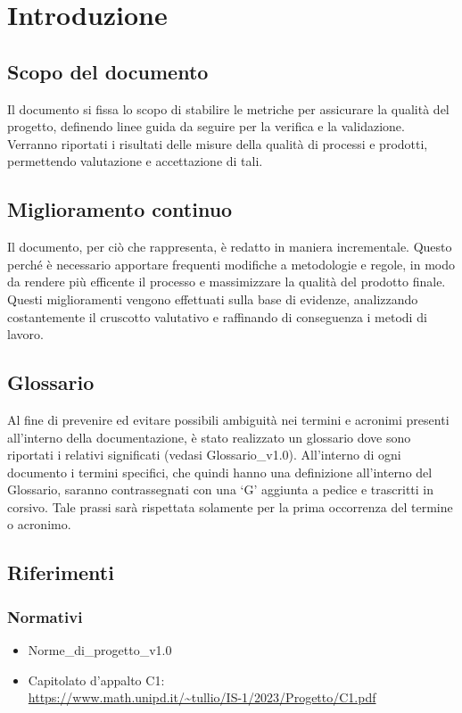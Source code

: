 \chapter{Introduzione}

\section{Scopo del documento}
Il documento si fissa lo scopo di stabilire le metriche per assicurare la qualità del progetto, definendo linee guida da seguire per la verifica e la validazione. Verranno riportati i risultati delle misure della qualità di processi e prodotti, permettendo valutazione e accettazione di tali.

\section{Miglioramento continuo}
Il documento, per ciò che rappresenta, è redatto in maniera incrementale. Questo perché è necessario apportare frequenti modifiche a metodologie e regole, in modo da rendere più efficente il processo e massimizzare la qualità del prodotto finale. Questi miglioramenti vengono effettuati sulla base di evidenze, analizzando costantemente il cruscotto valutativo e raffinando di conseguenza i metodi di lavoro.

\section{Glossario}
Al fine di prevenire ed evitare possibili ambiguità nei termini e acronimi presenti all’interno della documentazione, è stato realizzato un glossario dove sono riportati i relativi significati (vedasi Glossario\_v1.0). All’interno di ogni documento i termini specifici, che quindi hanno una definizione all’interno del Glossario, saranno contrassegnati con una ‘G’ aggiunta a pedice e trascritti in corsivo. Tale prassi sarà rispettata solamente per la prima occorrenza del termine o acronimo.

\section{Riferimenti}
\subsection{Normativi}
\begin{itemize}
    \item Norme\_di\_progetto\_v1.0
    \item Capitolato d'appalto C1: \\ \url{https://www.math.unipd.it/~tullio/IS-1/2023/Progetto/C1.pdf}
\end{itemize}

